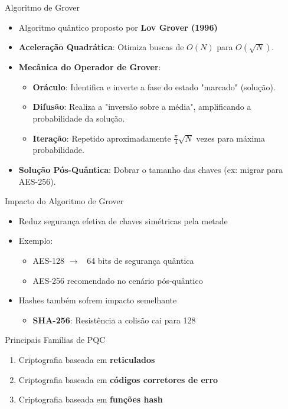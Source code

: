 \documentclass[aspectratio=169]{beamer}
\begin{document}
	\begin{frame}{Algoritmo de Grover}
		\begin{itemize}
			\item Algoritmo quântico proposto por \textbf{ Lov Grover (1996)}
			\item \textbf{Aceleração Quadrática}: Otimiza buscas de $O(N)$ para $O(\sqrt{N})$.
			\item \textbf{Mecânica do Operador de Grover}:
			\begin{itemize}
				\item \textbf{Oráculo}: Identifica e inverte a fase do estado "marcado" (solução).
				\item \textbf{Difusão}: Realiza a "inversão sobre a média", amplificando a probabilidade da solução.
				\item \textbf{Iteração}: Repetido aproximadamente $\frac{\pi}{4}\sqrt{N}$ vezes para máxima probabilidade.
			\end{itemize}
			\item \textbf{Solução Pós-Quântica}: Dobrar o tamanho das chaves (ex: migrar para AES-256).
		\end{itemize}
	\end{frame}
	\begin{frame}{Impacto do Algoritmo de Grover}
		\begin{itemize}
			\item Reduz segurança efetiva de chaves simétricas pela metade
			\item Exemplo:
			\begin{itemize}
				\item AES-128 \(\rightarrow\) ~64 bits de segurança quântica
				\item AES-256 recomendado no cenário pós-quântico
			\end{itemize}
			\item Hashes também sofrem impacto semelhante
			\begin{itemize}
				\item \textbf{SHA-256}: Resistência  a colisão cai para 128 
			\end{itemize}
		\end{itemize}
	\end{frame}
	 
	\begin{frame}{Principais Famílias de PQC}
		\begin{enumerate}
			\item Criptografia baseada em \textbf{reticulados}
			\item Criptografia baseada em \textbf{códigos corretores de erro}
			\item Criptografia baseada em \textbf{funções hash}
		\end{enumerate}
	\end{frame}
	
\end{document}

